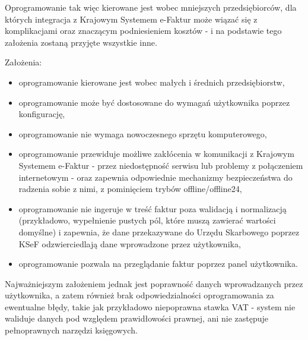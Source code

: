 Oprogramowanie tak więc kierowane jest wobec mniejszych przedsiębiorców, dla których integracja z Krajowym Systemem e-Faktur może wiązać się z komplikacjami oraz znaczącym podniesieniem kosztów - i na podstawie tego założenia zostaną przyjęte wszystkie inne.
\par
Założenia:
\begin{itemize}
    \setlength{\itemsep}{-3pt}
    \setlength{\parsep}{0pt}
    \setlength{\topsep}{6pt}
    \item oprogramowanie kierowane jest wobec małych i średnich przedsiębiorstw,
    \item oprogramowanie może być dostosowane do wymagań użytkownika poprzez konfigurację,
    \item oprogramowanie nie wymaga nowoczesnego sprzętu komputerowego,
    \item oprogramowanie przewiduje możliwe zakłócenia w komunikacji z Krajowym Systemem e-Faktur - przez niedostępność serwisu lub problemy z połączeniem internetowym - oraz zapewnia odpowiednie mechanizmy bezpieczeństwa do radzenia sobie z nimi, z pominięciem trybów offline/offline24,
    \item oprogramowanie nie ingeruje w treść faktur poza walidacją i normalizacją (przykładowo, wypełnienie pustych pól, które muszą zawierać wartości domyślne) i zapewnia, że dane przekazywane do Urzędu Skarbowego poprzez KSeF odzwierciedlają dane wprowadzone przez użytkownika,
    \item oprogramowanie pozwala na przeglądanie faktur poprzez panel użytkownika.
\end{itemize}

Najważniejszym założeniem jednak jest poprawność danych wprowadzanych przez użytkownika, a zatem również brak odpowiedzialności oprogramowania za ewentualne błędy, takie jak przykładowo niepoprawna stawka VAT - system nie waliduje danych pod względem prawidłowości prawnej, ani nie zastępuje pełnoprawnych narzędzi księgowych.

